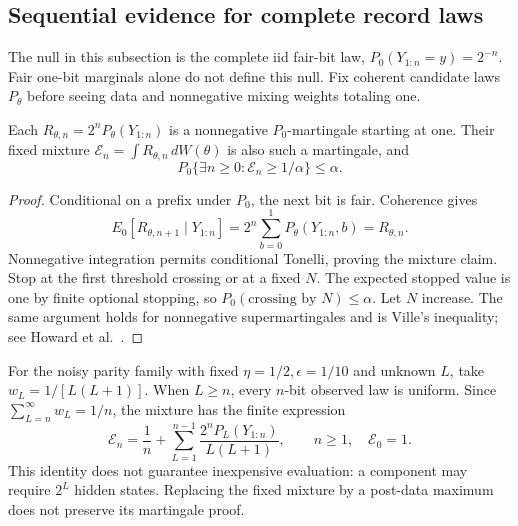 \subsection{Sequential evidence for complete record laws}
\label{op:sequential}

The null in this subsection is the complete iid fair-bit law,
\(P_0(Y_{1:n}=y)=2^{-n}\).
Fair one-bit marginals alone do not define this null.
Fix coherent candidate laws \(P_\theta\) before seeing data and
nonnegative mixing weights totaling one.

\begin{theorem}
\label{op:mixture}
Each \(R_{\theta,n}=2^nP_\theta(Y_{1:n})\) is a nonnegative
\(P_0\)-martingale starting at one.  Their fixed mixture
\(\mathcal E_n=\int R_{\theta,n}\,dW(\theta)\) is also such a martingale,
and
\[
 P_0\{\exists n\ge0:\mathcal E_n\ge1/\alpha\}\le\alpha.
\]
\end{theorem}
\begin{proof}
Conditional on a prefix under \(P_0\), the next bit is fair.
Coherence gives
\[
 E_0[R_{\theta,n+1}\mid Y_{1:n}]
 =2^n\sum_{b=0}^1P_\theta(Y_{1:n},b)=R_{\theta,n}.
\]
Nonnegative integration permits conditional Tonelli, proving the mixture
claim.  Stop at the first threshold crossing or at a fixed \(N\).
The expected stopped value is one by finite optional stopping, so
\(P_0(\text{crossing by }N)\le\alpha\).
Let \(N\) increase.  The same argument holds for nonnegative
supermartingales and is Ville's inequality; see
Howard et al.~\cite{op:howard}.
\end{proof}

For the noisy parity family with fixed \(\eta=1/2,\epsilon=1/10\)
and unknown \(L\), take \(w_L=1/[L(L+1)]\).
When \(L\ge n\), every \(n\)-bit observed law is uniform.
Since \(\sum_{L=n}^\infty w_L=1/n\), the mixture has the finite expression
\begin{equation}\label{op:length-mixture}
 \mathcal E_n=\frac1n+
 \sum_{L=1}^{n-1}\frac{2^nP_L(Y_{1:n})}{L(L+1)},\qquad n\ge1,
 \quad \mathcal E_0=1.
\end{equation}
This identity does not guarantee inexpensive evaluation: a component
may require \(2^L\) hidden states.  Replacing the fixed mixture by a
post-data maximum does not preserve its martingale proof.


